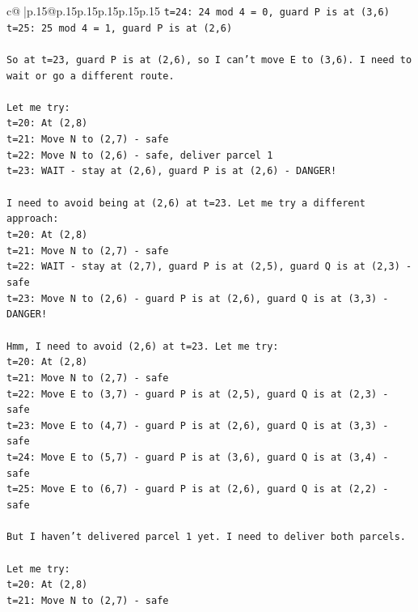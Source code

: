 \documentclass{article}
\begin{document}
{\begin{supertabular}{c@{$\;$}|p{.15\linewidth}@{}p{.15\linewidth}p{.15\linewidth}p{.15\linewidth}p{.15\linewidth}p{.15\linewidth}}
{{{\texttt{t=24: 24 mod 4 = 0, guard P is at (3,6)} \\
\texttt{t=25: 25 mod 4 = 1, guard P is at (2,6)} \\
\\ 
\texttt{So at t=23, guard P is at (2,6), so I can't move E to (3,6). I need to wait or go a different route.} \\
\\ 
\texttt{Let me try:} \\
\texttt{t=20: At (2,8)} \\
\texttt{t=21: Move N to (2,7) {-} safe} \\
\texttt{t=22: Move N to (2,6) {-} safe, deliver parcel 1} \\
\texttt{t=23: WAIT {-} stay at (2,6), guard P is at (2,6) {-} DANGER!} \\
\\ 
\texttt{I need to avoid being at (2,6) at t=23. Let me try a different approach:} \\
\texttt{t=20: At (2,8)} \\
\texttt{t=21: Move N to (2,7) {-} safe} \\
\texttt{t=22: WAIT {-} stay at (2,7), guard P is at (2,5), guard Q is at (2,3) {-} safe} \\
\texttt{t=23: Move N to (2,6) {-} guard P is at (2,6), guard Q is at (3,3) {-} DANGER!} \\
\\ 
\texttt{Hmm, I need to avoid (2,6) at t=23. Let me try:} \\
\texttt{t=20: At (2,8)} \\
\texttt{t=21: Move N to (2,7) {-} safe} \\
\texttt{t=22: Move E to (3,7) {-} guard P is at (2,5), guard Q is at (2,3) {-} safe} \\
\texttt{t=23: Move E to (4,7) {-} guard P is at (2,6), guard Q is at (3,3) {-} safe} \\
\texttt{t=24: Move E to (5,7) {-} guard P is at (3,6), guard Q is at (3,4) {-} safe} \\
\texttt{t=25: Move E to (6,7) {-} guard P is at (2,6), guard Q is at (2,2) {-} safe} \\
\\ 
\texttt{But I haven't delivered parcel 1 yet. I need to deliver both parcels.} \\
\\ 
\texttt{Let me try:} \\
\texttt{t=20: At (2,8)} \\
\texttt{t=21: Move N to (2,7) {-} safe} \\
}}}
\end{supertabular}}
\end{document}
